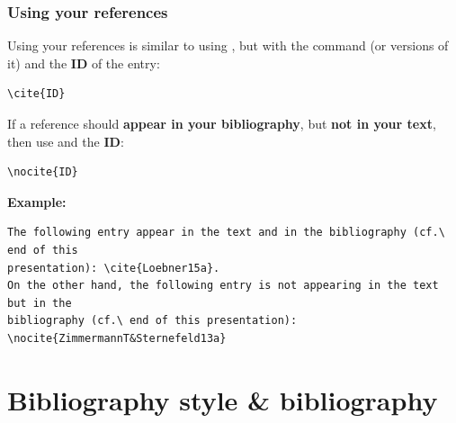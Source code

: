 \begin{frame}[fragile]
\frametitle{Using your references}

Using your references is similar to using , but with the command \textbf{} (or versions of it) and the \textbf{ID} of the entry:

\begin{lstlisting}
\cite{ID}
\end{lstlisting}


If a reference should \textbf{appear in your bibliography}, but \textbf{not in your text}, then use \textbf{} and the \textbf{ID}:

\begin{lstlisting}
\nocite{ID}
\end{lstlisting}

\pause 

\textbf{Example:}

\begin{lstlisting}
The following entry appear in the text and in the bibliography (cf.\ end of this 
presentation): \cite{Loebner15a}.
On the other hand, the following entry is not appearing in the text but in the 
bibliography (cf.\ end of this presentation): \nocite{ZimmermannT&Sternefeld13a}
\end{lstlisting}


\end{frame}


\section{Bibliography style \& bibliography}


